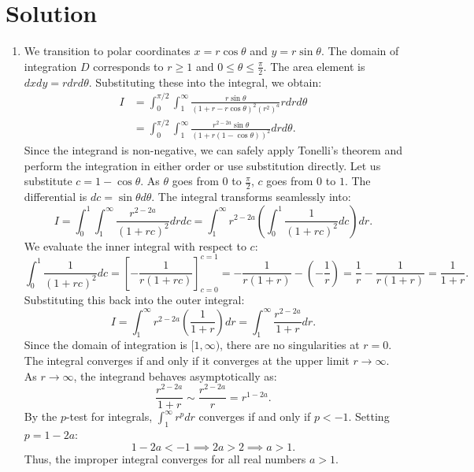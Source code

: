 \documentclass[10pt,a4paper]{article}
\begin{document}
\newpage
\section*{Solution}
\begin{enumerate}[label=\fbox{\arabic*}]
  \item %
        We transition to polar coordinates $x = r \cos \theta$ and $y = r \sin \theta$. The domain of integration $D$ corresponds to $r \ge 1$ and $0 \le \theta \le \frac{\pi}{2}$. The area element is $dxdy = r dr d\theta$.
        Substituting these into the integral, we obtain:
        \begin{align*}
          I &= \int_0^{\pi/2} \int_1^\infty \frac{r \sin \theta}{(1 + r - r \cos \theta)^2 (r^2)^a} r dr d\theta \\
          &= \int_0^{\pi/2} \int_1^\infty \frac{r^{2-2a} \sin \theta}{(1 + r(1 - \cos \theta))^2} dr d\theta.
        \end{align*}
        Since the integrand is non-negative, we can safely apply Tonelli's theorem and perform the integration in either order or use substitution directly. 
        Let us substitute $c = 1 - \cos \theta$. As $\theta$ goes from $0$ to $\frac{\pi}{2}$, $c$ goes from $0$ to $1$. The differential is $dc = \sin \theta d\theta$. The integral transforms seamlessly into:
        \[
          I = \int_0^1 \int_1^\infty \frac{r^{2-2a}}{(1 + rc)^2} dr dc = \int_1^\infty r^{2-2a} \left( \int_0^1 \frac{1}{(1 + rc)^2} dc \right) dr.
        \]
        We evaluate the inner integral with respect to $c$:
        \[
          \int_0^1 \frac{1}{(1 + rc)^2} dc = \left[ -\frac{1}{r(1+rc)} \right]_{c=0}^{c=1} = -\frac{1}{r(1+r)} - \left(-\frac{1}{r}\right) = \frac{1}{r} - \frac{1}{r(1+r)} = \frac{1}{1+r}.
        \]
        Substituting this back into the outer integral:
        \[
          I = \int_1^\infty r^{2-2a} \left( \frac{1}{1+r} \right) dr = \int_1^\infty \frac{r^{2-2a}}{1+r} dr.
        \]
        Since the domain of integration is $[1, \infty)$, there are no singularities at $r = 0$. The integral converges if and only if it converges at the upper limit $r \to \infty$.
        As $r \to \infty$, the integrand behaves asymptotically as:
        \[
          \frac{r^{2-2a}}{1+r} \sim \frac{r^{2-2a}}{r} = r^{1-2a}.
        \]
        By the $p$-test for integrals, $\int_1^\infty r^p dr$ converges if and only if $p < -1$. Setting $p = 1 - 2a$:
        \[
          1 - 2a < -1 \implies 2a > 2 \implies a > 1.
        \]
        Thus, the improper integral converges for all real numbers $a > 1$.


\end{enumerate}
\end{document}
